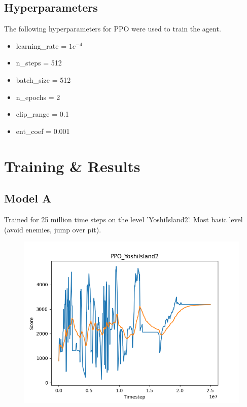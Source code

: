 \documentclass{article}
\begin{document}
    \subsection{Hyperparameters}
    The following hyperparameters for PPO were used to train the agent.
    \begin{itemize}
        \item learning\_rate = $1e^{-4}$
        \item n\_steps = 512
        \item batch\_size = 512
        \item n\_epochs = 2
        \item clip\_range = 0.1
        \item ent\_coef = 0.001
    \end{itemize}

    \section{Training \& Results}
    \subsection{Model A}
    Trained for 25 million time steps on the level 'YoshiIsland2'.
    Most basic level (avoid enemies, jump over pit).
    \begin{figure}[H]
        \centering
        \includegraphics[width=\textwidth]{plot_model_a.png}
    \end{figure}

    \printbibliography
\end{document}
